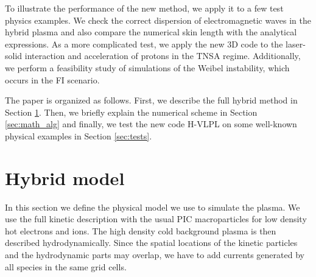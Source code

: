 \documentclass[conference]{IEEEtran}
\renewcommand{\~}{\widetilde }
\begin{document}

To illustrate the performance of the new method, we apply it to a few test physics
examples. We check the correct dispersion of electromagnetic waves in
the hybrid plasma and also compare the numerical skin length with the
analytical expressions. As a more complicated test, we apply the new
3D code to the laser-solid interaction and acceleration of protons in
the TNSA regime. Additionally, we perform a feasibility study of simulations 
of the Weibel instability, which occurs in the FI scenario.

The paper is organized as follows. First, we describe the full hybrid
method in Section \ref{sec:math}. Then, we briefly explain the numerical
scheme in Section \ref{sec:math_alg} and finally, we test the new
code H-VLPL on some well-known physical examples in
Section \ref{sec:tests}. 


\section{Hybrid model}\label{sec:math}

In this section we define the physical model we use to simulate the
plasma. We use the full kinetic description with the usual PIC
macroparticles for low density hot electrons and ions. The high density cold
background plasma is then described hydrodynamically. Since the
spatial locations of the kinetic particles and the hydrodynamic parts
may overlap, we have to add currents generated by all species in the
same grid cells. 
\end{document}
